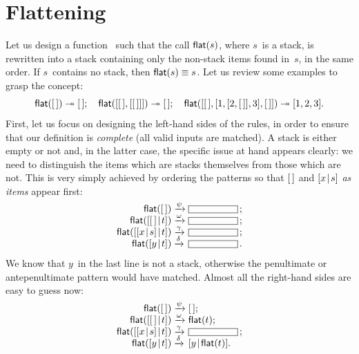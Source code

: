 \section{Flattening}
\label{sec:flattening}

Let us design a function~ such
that the call \(\textsf{flat}(s)\), where \(s\)~is a stack, is rewritten
into a stack containing only the non\hyp{}stack items found in~\(s\),
in the same order. If \(s\)~contains no stack, then \(\textsf{flat}(s)
\equiv s\). Let us review some
examples to grasp the concept:
\begin{equation*}
\textsf{flat}([\,]) \twoheadrightarrow [\,]; \quad
\textsf{flat}([[\,],[[\,]]]) \twoheadrightarrow [\,];\quad
\textsf{flat}([[\,],[1,[2,[\,]],3],[\,]]) \twoheadrightarrow [1,2,3].
\end{equation*}
First, let us focus on designing the left\hyp{}hand sides of the
rules, in order to ensure that our definition is \emph{complete} (all
valid inputs are matched). A stack is either empty or not and, in the
latter case, the specific issue at hand appears clearly: we need to
distinguish the items which are stacks themselves from those which are
not. This is very simply achieved by ordering the patterns so that
\([\,]\) and \([{x}\!\mid\!{s}]\) \emph{as items} appear
first:
\begin{equation*}
\begin{array}{r@{\;}l@{\;}l}
\fun{flat}(\el)                   & \xrightarrow{\smash{\psi}}   & \fbcode{CCCCCCC}\,;\\
\fun{flat}(\cons{\el}{t})         & \xrightarrow{\smash{\omega}} & \fbcode{CCCCCCC}\,;\\
\fun{flat}(\cons{\cons{x}{s}}{t}) & \xrightarrow{\smash{\gamma}} & \fbcode{CCCCCCC}\,;\\
\fun{flat}(\cons{y}{t})           & \xrightarrow{\smash{\delta}} & \fbcode{CCCCCCC}\,.
\end{array}
\end{equation*}
We know that \(y\)~in the last line is not a stack, otherwise the
penultimate or antepenultimate pattern would have matched. Almost all
the right\hyp{}hand sides are easy to guess now:
\begin{equation*}
\begin{array}{r@{\;}l@{\;}l}
\fun{flat}(\el)                   & \xrightarrow{\smash{\psi}}   & \el;\\
\fun{flat}(\cons{\el}{t})         & \xrightarrow{\smash{\omega}} & \fun{flat}(t);\\
\fun{flat}(\cons{\cons{x}{s}}{t}) & \xrightarrow{\smash{\gamma}} & \fbcode{CCCCCCC}\,;\\
\fun{flat}(\cons{y}{t})           & \xrightarrow{\smash{\delta}} & \cons{y}{\fun{flat}(t)}.
\end{array}
\end{equation*}
